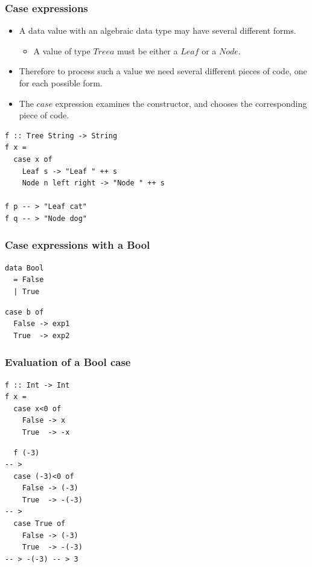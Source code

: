 \documentclass{beamer}
\begin{document}
\begin{frame}[fragile]
\frametitle{Case expressions}

\begin{itemize}
\item A data value with an algebraic data type may have
  several different forms.
  \begin{itemize}
  \item A value of type $Tree a$ must be either a $Leaf$ or a
    $Node$.
  \end{itemize}
\item Therefore to process such a value we need several different
  pieces of code, one for each possible form.
\item The $case$ expression examines the constructor, and chooses
  the corresponding piece of code.
\end{itemize}

\begin{verbatim}
f :: Tree String -> String
f x =
  case x of
    Leaf s -> "Leaf " ++ s
    Node n left right -> "Node " ++ s

f p -- > "Leaf cat"
f q -- > "Node dog"
\end{verbatim}

\end{frame}

\begin{frame}[fragile]
\frametitle{Case expressions with a Bool}

\begin{verbatim}
data Bool
  = False
  | True
\end{verbatim}

\begin{verbatim}
case b of
  False -> exp1
  True  -> exp2
\end{verbatim}

\end{frame}

\begin{frame}[fragile]
\frametitle{Evaluation of a Bool case}

\begin{verbatim}
f :: Int -> Int
f x =
  case x<0 of
    False -> x
    True  -> -x
  \end{verbatim}

\begin{verbatim}
  f (-3)
-- >
  case (-3)<0 of
    False -> (-3)
    True  -> -(-3)
-- >
  case True of
    False -> (-3)
    True  -> -(-3)
-- > -(-3) -- > 3
\end{verbatim}

\end{frame}
\end{document}
